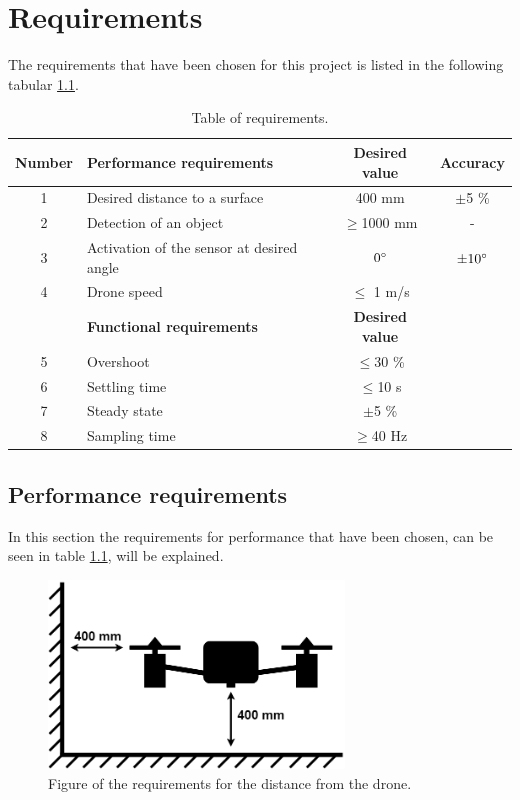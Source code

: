 \chapter{Requirements}\label{ch:Req}
The requirements that have been chosen for this project is listed in the following tabular \ref{tab:req}.  

\begin{table}[H]
\caption{Table of requirements.}\label{tab:req}
\begin{tabular}{|c|l|c|c|}
\hline
\textbf{Number} & \textbf{Performance requirements}  & \textbf{Desired value}& \textbf{Accuracy} \\ \hline
1 & Desired distance to a surface             & 400 mm       & $\pm$5 \% \\ \hline
2 & Detection of an object                    & $\geq$1000 mm      & -  \\ \hline
3 & Activation of the sensor at desired angle & $0\degree$          & $\pm10 \degree$  \\ \hline
4 & Drone speed                               & $\leq$ 1 m/s &   \\ \hline
 & \textbf{Functional requirements}  & \textbf{Desired value} & \\ \hline
5 & Overshoot              & $\leq$30 \% & \\ \hline
6 & Settling time           & $\leq$10 s & \\ \hline
7 & Steady state            & $\pm$5 \% & \\ \hline
8 & Sampling time          & $\geq$40 Hz   & \\ \hline
\end{tabular}
\end{table}

\section{Performance requirements} \label{sec:req}
In this section the requirements for performance that have been chosen, can be seen in table \ref{tab:req}, will be explained. %

\begin{figure}[h]
    \centering
    \includegraphics[width=0.70\textwidth]{figures/ch_req/figure_requirements.png}
    \caption{Figure of the requirements for the distance from the drone.}
    \label{fig:req_fig}
\end{figure}

